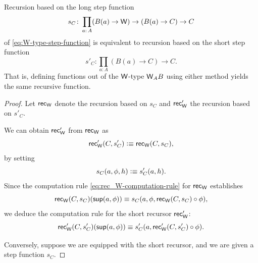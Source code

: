 \begin{lem}\label{lem:long-and-short-recursion}
    Recursion based on the long step function
    \[
        s_C\colon\prod_{a\colon A}
            (B(a)\to\fun W)\to(B(a)\to C)\to C
    \]
    of \eqref{eq:W-type-step-function} is equivalent to recursion based on the short step function
    \[
        s'_C\colon\prod_{a\colon A}(B(a)\to C)\to C.
    \]
    That is, defining functions out of the\/ $\mathsf{W}$-type\/ $\mathsf{W}_AB$ using either method yields the same recursive function.
\end{lem}

\begin{proof}
    Let $\mathsf{rec}_{\mathsf{W}}$ denote the recursion based on $s_C$ and $\mathsf{rec}'_{\mathsf{W}}$ the recursion based on $s'_C$.
    
    We can obtain $\mathsf{rec}'_{\mathsf{W}}$ from $\mathsf{rec}_{\mathsf{W}}$ as
    \[
        \mathsf{rec}'_{\mathsf{W}}(C,s'_C)
            \mathrel{\vcentcolon}\equiv\mathsf{rec}_{\mathsf{W}}(C,s_C),
    \]
    by setting
    \[
        s_C(a,\phi,h)\mathrel{\vcentcolon}\equiv s'_C(a,h).
    \]
    Since the computation rule \eqref{eq:rec_W-computation-rule} for $\mathsf{rec}_{\mathsf{W}}$ establishes
    \[
        \mathsf{rec}_{\mathsf{W}}(C,s_C)(\mathsf{sup}(a,\phi))
            \equiv s_C(a,\phi,\mathsf{rec}_{\mathsf{W}}
                (C,s_C)\circ\phi),
    \]
    we deduce the computation rule for the short recursor $\mathsf{rec}'_{\mathsf{W}}$:
    \begin{equation}\label{eq:W-short-computation-rule}
        \mathsf{rec}'_{\mathsf{W}}(C,s'_C)(\mathsf{sup}(a,\phi))
            \equiv s'_C
                (
                    a,
                    \mathsf{rec}'_{\mathsf{W}}(C,s'_C)\circ\phi
                ).
    \end{equation}
    
    Conversely, suppose we are equipped with the short recursor, and we are given a step function $s_C$.


\end{proof}

